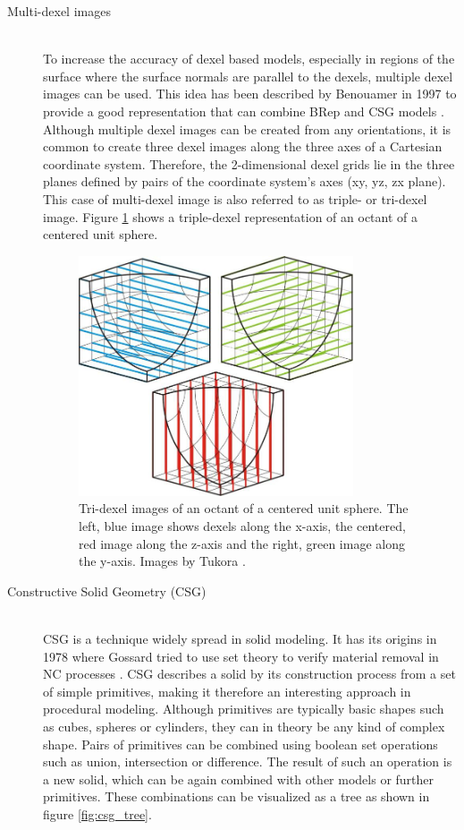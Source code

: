 \begin{description}
		
	\item[Multi-dexel images] \hfill \\
	To increase the accuracy of dexel based models, especially in regions of the surface where the surface normals are parallel to the dexels, multiple dexel images can be used.
	This idea has been described by Benouamer \etal in 1997 to provide a good representation that can combine BRep and CSG models \cite{tridexel_intersection}.
	Although multiple dexel images can be created from any orientations, it is common to create three dexel images along the three axes of a Cartesian coordinate system.
	Therefore, the 2-dimensional dexel grids lie in the three planes defined by pairs of the coordinate system's axes (xy, yz, zx plane).
	This case of multi-dexel image is also referred to as triple- or tri-dexel image.
	Figure \ref{fig:tri_dexel_image} shows a triple-dexel representation of an octant of a centered unit sphere.
	
	\begin{figure}[H]
		\centering
		\includegraphics[width=0.8\textwidth]{images/tridexels}
		\caption{
			Tri-dexel images of an octant of a centered unit sphere.
			The left, blue image shows dexels along the x-axis, the centered, red image along the z-axis and the right, green image along the y-axis.
			Images by Tukora \cite{virtual_machining_review}.
		}
		\label{fig:tri_dexel_image}
	\end{figure}


	\item[Constructive Solid Geometry (CSG)] \hfill \\
	CSG is a technique widely spread in solid modeling.
	It has its origins in 1978 where Gossard \etal tried to use set theory to verify material removal in NC processes \cite{csg}.
	CSG describes a solid by its construction process from a set of simple primitives, making it therefore an interesting approach in procedural modeling.
	Although primitives are typically basic shapes such as cubes, spheres or cylinders, they can in theory be any kind of complex shape.
	Pairs of primitives can be combined using boolean set operations such as union, intersection or difference.
	The result of such an operation is a new solid, which can be again combined with other models or further primitives.
	These combinations can be visualized as a tree as shown in figure \ref{fig:csg_tree}.
	

\end{description}
